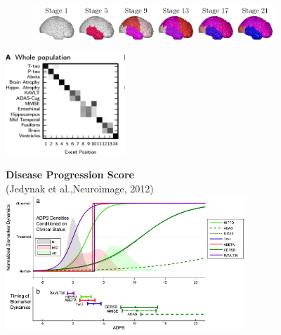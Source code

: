 \begin{frame}
\begin{itemize}
\begin{small}
\begin{figure}[h]
\begin{minipage}[t][\mnpHeight][t]{0.49\linewidth}
\begin{subfigure}{0.57\textwidth}
    \includegraphics[width=\textwidth,trim=450 0 0 0,clip]{young_progression2} 
    \end{subfigure}
    \includegraphics[width=0.4\textwidth]{young_positional_variance}
   \end{minipage}
   \begin{minipage}[t][\mnpHeight][t]{0.49\linewidth}
    \centering
    \textbf{Disease Progression Score}\\ \footnotesize{(Jedynak et al.,Neuroimage, 2012)}
    \includegraphics[width=0.8\textwidth,trim=0 80 0 0, clip]{dps_diagram}
   \end{minipage}


\end{figure}
\end{small}
\end{itemize}
\end{frame}
